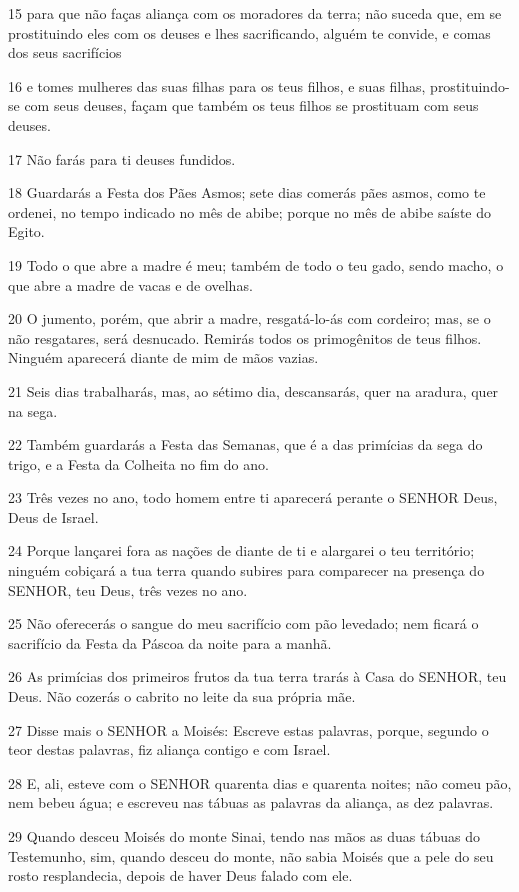 \par 15 para que não faças aliança com os moradores da terra; não suceda que, em se prostituindo eles com os deuses e lhes sacrificando, alguém te convide, e comas dos seus sacrifícios
\par 16 e tomes mulheres das suas filhas para os teus filhos, e suas filhas, prostituindo-se com seus deuses, façam que também os teus filhos se prostituam com seus deuses.
\par 17 Não farás para ti deuses fundidos.
\par 18 Guardarás a Festa dos Pães Asmos; sete dias comerás pães asmos, como te ordenei, no tempo indicado no mês de abibe; porque no mês de abibe saíste do Egito.
\par 19 Todo o que abre a madre é meu; também de todo o teu gado, sendo macho, o que abre a madre de vacas e de ovelhas.
\par 20 O jumento, porém, que abrir a madre, resgatá-lo-ás com cordeiro; mas, se o não resgatares, será desnucado. Remirás todos os primogênitos de teus filhos. Ninguém aparecerá diante de mim de mãos vazias.
\par 21 Seis dias trabalharás, mas, ao sétimo dia, descansarás, quer na aradura, quer na sega.
\par 22 Também guardarás a Festa das Semanas, que é a das primícias da sega do trigo, e a Festa da Colheita no fim do ano.
\par 23 Três vezes no ano, todo homem entre ti aparecerá perante o SENHOR Deus, Deus de Israel.
\par 24 Porque lançarei fora as nações de diante de ti e alargarei o teu território; ninguém cobiçará a tua terra quando subires para comparecer na presença do SENHOR, teu Deus, três vezes no ano.
\par 25 Não oferecerás o sangue do meu sacrifício com pão levedado; nem ficará o sacrifício da Festa da Páscoa da noite para a manhã.
\par 26 As primícias dos primeiros frutos da tua terra trarás à Casa do SENHOR, teu Deus. Não cozerás o cabrito no leite da sua própria mãe.
\par 27 Disse mais o SENHOR a Moisés: Escreve estas palavras, porque, segundo o teor destas palavras, fiz aliança contigo e com Israel.
\par 28 E, ali, esteve com o SENHOR quarenta dias e quarenta noites; não comeu pão, nem bebeu água; e escreveu nas tábuas as palavras da aliança, as dez palavras.
\par 29 Quando desceu Moisés do monte Sinai, tendo nas mãos as duas tábuas do Testemunho, sim, quando desceu do monte, não sabia Moisés que a pele do seu rosto resplandecia, depois de haver Deus falado com ele.
